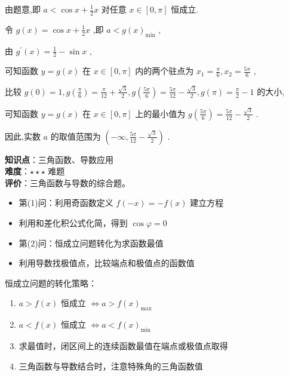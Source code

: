 \documentclass[10pt]{article}
\begin{document}
由题意,即 \(a < \cos x + \frac{1}{2}x\) 对任意 \(x \in  \left\lbrack  {0,\pi }\right\rbrack\) 恒成立.

令 \(g\left( x\right)  = \cos x + \frac{1}{2}x\) ,即 \(a < g{\left( x\right) }_{\min }\) ,

由 \({g}^{\prime }\left( x\right)  = \frac{1}{2} - \sin x\) ,

可知函数 \(y = g\left( x\right)\) 在 \(x \in  \left\lbrack  {0,\pi }\right\rbrack\) 内的两个驻点为 \({x}_{1} = \frac{\pi }{6},{x}_{2} = \frac{5\pi }{6}\) ,

比较 \(g\left( 0\right)  = 1, g\left( \frac{\pi }{6}\right)  = \frac{\pi }{12} + \frac{\sqrt{3}}{2}, g\left( \frac{5\pi }{6}\right)  = \frac{5\pi }{12} - \frac{\sqrt{3}}{2}, g\left( \pi \right)  = \frac{\pi }{2} - 1\) 的大小,

可知函数 \(y = g\left( x\right)\) 在 \(x \in  \left\lbrack  {0,\pi }\right\rbrack\) 上的最小值为 \(g\left( \frac{5\pi }{6}\right)  = \frac{5\pi }{12} - \frac{\sqrt{3}}{2}\) .

因此,实数 \(a\) 的取值范围为 \(\left( {-\infty ,\frac{5\pi }{12} - \frac{\sqrt{3}}{2}}\right)\) .

\begin{analysisbox}[考点分析]
\textbf{知识点}：三角函数、导数应用\\
\textbf{难度}：\(\star\star\star\) 难题\\
\textbf{评价}：三角函数与导数的综合题。
\begin{itemize}
\item 第(1)问：利用奇函数定义 \(f(-x) = -f(x)\) 建立方程
\item 利用和差化积公式化简，得到 \(\cos\varphi = 0\)
\item 第(2)问：恒成立问题转化为求函数最值
\item 利用导数找极值点，比较端点和极值点的函数值
\end{itemize}
\end{analysisbox}

\begin{tipbox}[教学提示]
恒成立问题的转化策略：
\begin{enumerate}
\item \(a > f(x)\) 恒成立 \(\Leftrightarrow a > f(x)_{\max}\)
\item \(a < f(x)\) 恒成立 \(\Leftrightarrow a < f(x)_{\min}\)
\item 求最值时，闭区间上的连续函数最值在端点或极值点取得
\item 三角函数与导数结合时，注意特殊角的三角函数值
\end{enumerate}
\end{tipbox}
\end{document}
